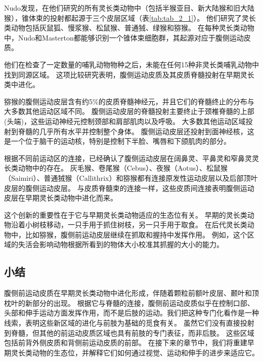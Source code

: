Nudo\cite{nudo1988descending,nudo1990descending}发现，在他们研究的所有灵长类动物中（包括半猴亚目、新大陆猴和旧大陆猴），锥体束的投射都起源于三个皮层区域（表\ref{tab:tab_2_1}）。
他们研究了灵长类动物包括灰鼠狐、慢浆猴、松鼠猴、普通狨、绿猴和猕猴。
在每种灵长类动物中，Nudo和Masterton都能够识别一个锥体束细胞群，其起源对应于腹侧运动皮质。


他们在检查了一定数量的哺乳动物物种之后，未能在任何15种非灵长类哺乳动物中找到同源区域。
这项比较研究表明，腹侧运动皮质及其皮质脊髓投射在早期灵长类中进化。


猕猴的腹侧运动皮层含有约5\%的皮质脊髓神经元\cite{dum2004motor}，并且它们的脊髓终止的分布与大多数其他运动区域不同。
腹侧运动皮层的脊髓投射主要终止于颈椎脊髓的上部(头端)，这些运动神经元控制颈部和肩部肌肉以及呼吸。
大多数其他运动区域投射到脊髓的几乎所有水平并控制整个身体。
腹侧运动皮层还投射到面神经核，这是一个位于脑干的运动核，特别是控制下半脸、嘴唇和下颌肌肉的部分\cite{morecraft2001cortical}。


根据不同前运动区的连接，已经确认了腹侧运动皮层在阔鼻灵、平鼻灵和窄鼻灵灵长类动物中的存在\cite{kaas2004evolution}。
灰毛猴、卷尾猴（Cebus）\cite{dum2004motor}、夜猴（Aotus）\cite{preuss1996movement,gharbawie2010thalamocortical}、松鼠猴（Saimiri）\cite{cowey1968varying}、普通狨猴（Callithrix）\cite{burish2008microstimulation}和猕猴\cite{lu1994interconnections}都有连接原发性运动皮层以及后部顶叶皮层的腹侧运动皮层。
与皮质脊髓束的连接一样，这些皮质间连接表明腹侧运动皮层在早期灵长类动物中进化而来。


这个创新的重要性在于它与早期灵长类动物适应的生态位有关。
早期的灵长类动物沿着小树枝移动，一只手用于抓住树枝，另一只手用于取食。
在后代灵长类动物中，比如猕猴，腹侧前运动皮层继续在抓取和握持中发挥作用。
例如，这个区域的失活会影响动物根据所看到的物体大小校准其抓握的大小的能力\cite{fogassi2001cortical}。



\subsection{小结}
腹侧前运动皮质在早期灵长类动物中进化形成，伴随着颗粒前额叶皮层、颞叶和顶枕叶的新部分的出现。
根据它与脊髓的连接，腹侧前运动皮质似乎在控制口部、头部和伸手运动方面发挥作用，而不是后肢的运动。我们把这种专门化看作是一种线索，表明这些新区域的进化与前肢为基础的觅食有关。
虽然它们没有直接投射到脊髓，但其他的前运动皮质区域也具有前肢的专门表征，而非后肢。
这些区域包括前背外侧皮质和背侧前运动皮质的前部。
在接下来的章节中，我们将重建早期灵长类动物的生态位，并解释它们如何通过视觉、运动和伸手的进步来适应它。



